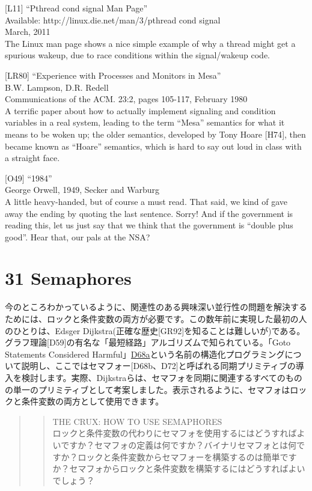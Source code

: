 {[}L11{]} ``Pthread cond signal Man Page''\\
Available: http://linux.die.net/man/3/pthread cond signal\\
March, 2011\\
The Linux man page shows a nice simple example of why a thread might get
a spurious wakeup, due to race conditions within the signal/wakeup code.

{[}LR80{]} ``Experience with Processes and Monitors in Mesa''\\
B.W. Lampson, D.R. Redell\\
Communications of the ACM. 23:2, pages 105-117, February 1980\\
A terrific paper about how to actually implement signaling and condition
variables in a real system, leading to the term ``Mesa'' semantics for
what it means to be woken up; the older semantics, developed by Tony
Hoare {[}H74{]}, then became known as ``Hoare'' semantics, which is hard
to say out loud in class with a straight face.

{[}O49{]} ``1984''\\
George Orwell, 1949, Secker and Warburg\\
A little heavy-handed, but of course a must read. That said, we kind of
gave away the ending by quoting the last sentence. Sorry! And if the
government is reading this, let us just say that we think that the
government is ``double plus good''. Hear that, our pals at the NSA?

\newpage

\hypertarget{semaphores}{%
\section*{31 Semaphores}\label{semaphores}}

今のところわかっているように、関連性のある興味深い並行性の問題を解決するためには、ロックと条件変数の両方が必要です。この数年前に実現した最初の人のひとりは、Edsger
Dijkstra(正確な歴史{[}GR92{]}を知ることは難しいが)である。グラフ理論{[}D59{]}の有名な「最短経路」アルゴリズムで知られている。「Goto
Statements Considered
Harmful」\href{これはすばらしいタイトルです}{D68a}という名前の構造化プログラミングについて説明し、ここではセマフォー{[}D68b、D72{]}と呼ばれる同期プリミティブの導入を検討します。実際、Dijkstraらは、セマフォを同期に関連するすべてのものの単一のプリミティブとして考案しました。表示されるように、セマフォはロックと条件変数の両方として使用できます。

\begin{quote}
\begin{quote}
THE CRUX: HOW TO USE SEMAPHORES\\
ロックと条件変数の代わりにセマフォを使用するにはどうすればよいですか？セマフォの定義は何ですか？バイナリセマフォとは何ですか？ロックと条件変数からセマフォーを構築するのは簡単ですか？セマフォからロックと条件変数を構築するにはどうすればよいでしょう？
\end{quote}
\end{quote}

